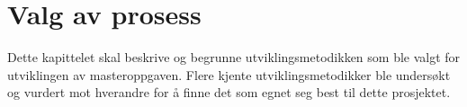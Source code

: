 \chapter{Valg av prosess}
Dette kapittelet skal beskrive og begrunne utviklingsmetodikken som ble valgt for utviklingen av masteroppgaven. Flere kjente utviklingsmetodikker ble undersøkt og vurdert mot hverandre for å finne det som egnet seg best til dette prosjektet.



